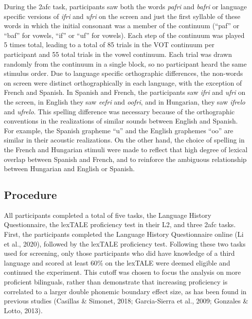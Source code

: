 \documentclass[
  man,floatsintext]{apa6}
\begin{document}
During the 2afc task, participants saw both the words \emph{pafri} and \emph{bafri} or language specific versions of \emph{ifri} and \emph{ufri} on the screen and just the first syllable of these words in which the initial consonant was a member of the continuum (``paf'' or ``baf'' for vowels, ``if'' or ``uf'' for vowels).
Each step of the continuum was played 5 times total, leading to a total of 85 trials in the VOT continuum per participant and 55 total trials in the vowel continuum.
Each trial was drawn randomly from the continuum in a single block, so no participant heard the same stimulus order.
Due to language specific orthographic differences, the non-words on screen were distinct orthographically in each language, with the exception of French and Spanish.
In Spanish and French, the participants saw \emph{ifri} and \emph{ufri} on the screen, in English they saw \emph{eefri} and \emph{oofri}, and in Hungarian, they saw \emph{ifrelo} and \emph{ufrelo}. This spelling difference was necessary because of the orthographic conventions in the realizations of similar sounds between English and Spanish. For example, the Spanish grapheme ``u'' and the English graphemes ``oo'' are similar in their acoustic realizations. On the other hand, the choice of spelling in the French and Hungarian stimuli were made to reflect that high degree of lexical overlap between Spanish and French, and to reinforce the ambiguous relationship between Hungarian and English or Spanish.

\hypertarget{procedure}{%
\subsection{Procedure}\label{procedure}}

All participants completed a total of five tasks, the Language History Questionnaire, the lexTALE proficiency test in their L2, and three 2afc tasks. First, the participants completed the Language History Questionnaire online (Li et al., 2020), followed by the lexTALE proficiency test.
Following these two tasks used for screening, only those participants who did have knowledge of a third language and scored at least 60\% on the lexTALE were deemed eligible and continued the experiment. This cutoff was chosen to focus the analysis on more proficient bilinguals, rather than demonstrate that increasing proficiency is correlated to a larger double phonemic boundary effect size, as has been found in previous studies (Casillas \& Simonet, 2018; Garcia-Sierra et al., 2009; Gonzales \& Lotto, 2013).
\end{document}
